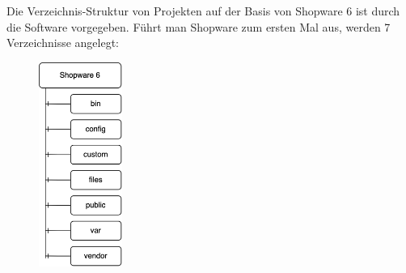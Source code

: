Die Verzeichnis-Struktur von Projekten auf der Basis von Shopware 6 ist durch die Software vorgegeben.
Führt man Shopware zum ersten Mal aus, werden 7 Verzeichnisse angelegt:
\begin{figure}
    \centering
    \includegraphics[width=0.244\textwidth]{images/content/shopware-folder-structure}
    \label{fig:shopware-folder-structure}
\end{figure}
\begingroup
    \vspace{-0.3cm}
    \addtolength{\leftmargini}{-0.3cm}
